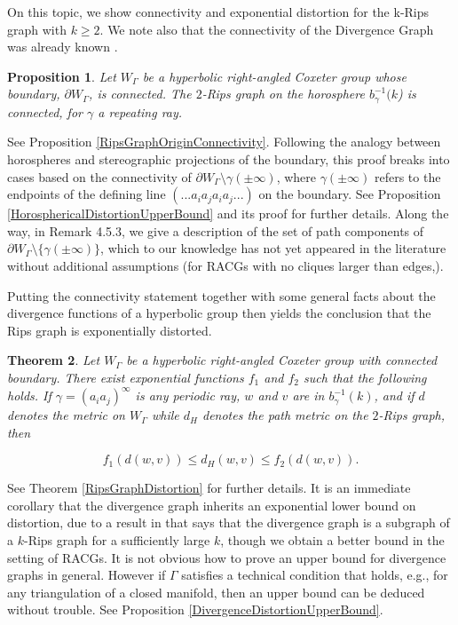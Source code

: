 \documentclass[10pt,a4paper]{amsart}
\newtheorem{theorem}{Theorem}[subsection]
\newtheorem{proposition}[theorem]{Proposition}
\theoremstyle{definition}
\theoremstyle{remark}
\begin{document}
	On this topic, we show connectivity and exponential distortion for the k-Rips graph with $k\ge 2$. We note also that the connectivity of the Divergence Graph was already known \cite{CGSR}.
	
	\begin{proposition}
		
		Let $W_\Gamma$ be a hyperbolic right-angled Coxeter group whose boundary, $\partial W_\Gamma$, is connected. The $2$-Rips graph on the horosphere $b_\gamma^{-1}(k$) is connected, for $\gamma$ a repeating ray.
		
	\end{proposition}
	
	See Proposition \ref{RipsGraphOriginConnectivity}. Following the analogy between horospheres and stereographic projections of the boundary, this proof breaks into cases based on the connectivity of \newline $\partial W_\Gamma\setminus \gamma(\pm\infty)$, where $\gamma(\pm\infty)$ refers to the endpoints of the defining line $(...a_ia_ja_ia_j...)$ on the boundary. See Proposition \ref{HorosphericalDistortionUpperBound} and its proof for further details. Along the way, in Remark 4.5.3, we give a description of the set of path components of $\partial W_\Gamma\setminus\{\gamma(\pm\infty)\}$, which to our knowledge has not yet appeared in the literature without additional assumptions (for RACGs with no cliques larger than edges,\cite{DaniThomas,ThetaGraphs,Edletzberger}).
	
	Putting the connectivity statement together with some general facts about the divergence functions of a hyperbolic group then yields the conclusion that the Rips graph is exponentially distorted.
	
	\begin{theorem}
		
		Let $W_\Gamma$ be a hyperbolic right-angled Coxeter group with connected boundary. There exist exponential functions $f_1$ and $f_2$ such that the following holds. If $\gamma=(a_ia_j)^\infty$ is any periodic ray, $w$ and $v$ are in $b_\gamma^{-1}(k)$, and if $d$ denotes the metric on $W_\Gamma$ while $d_H$ denotes the path metric on the $2$-Rips graph, then 
		
		$$ f_1(d(w, v))\le d_H(w, v)\le f_2(d(w, v)).$$
	\end{theorem} 
	
	See Theorem \ref{RipsGraphDistortion} for further details. It is an immediate corollary that the divergence graph inherits an exponential lower bound on distortion, due to a result in \cite{CGSR} that says that the divergence graph is a subgraph of a $k$-Rips graph for a sufficiently large $k$, though we obtain a better bound in the setting of RACGs. It is not obvious how to prove an upper bound for divergence graphs in general. However if $\Gamma$ satisfies a technical condition that holds, e.g., for any triangulation of a closed manifold, then an upper bound can be deduced without trouble. See Proposition \ref{DivergenceDistortionUpperBound}.
	
\end{document}
